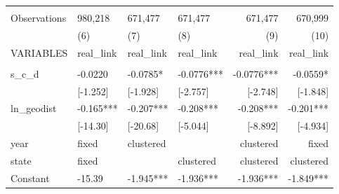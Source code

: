 \documentclass[a4paper]{article}
\begin{document}
\begin{table}[htbp]
\begin{tabular}{p{9.7em}lllrr}
          & \multicolumn{1}{p{5.3em}}{} & \multicolumn{1}{p{5.3em}}{} & \multicolumn{1}{p{5.3em}}{} & \multicolumn{1}{p{5.3em}}{} & \multicolumn{1}{p{5.3em}}{} \\
    Observations & \multicolumn{1}{p{5.3em}}{980,218} & \multicolumn{1}{p{5.3em}}{671,477} & \multicolumn{1}{p{5.3em}}{671,477} & \multicolumn{1}{p{5.3em}}{671,477} & \multicolumn{1}{p{5.3em}}{670,999} \\
    \midrule
          & \multicolumn{1}{p{5.3em}}{(6)} & \multicolumn{1}{p{5.3em}}{(7)} & \multicolumn{1}{p{5.3em}}{(8)} & \multicolumn{1}{p{5.3em}}{(9)} & \multicolumn{1}{p{5.3em}}{(10)} \\
    VARIABLES & \multicolumn{1}{p{5.3em}}{real\_link} & \multicolumn{1}{p{5.3em}}{real\_link} & \multicolumn{1}{p{5.3em}}{real\_link} & \multicolumn{1}{p{5.3em}}{real\_link} & \multicolumn{1}{p{5.3em}}{real\_link} \\
    \midrule
          & \multicolumn{1}{p{5.3em}}{} & \multicolumn{1}{p{5.3em}}{} & \multicolumn{1}{p{5.3em}}{} & \multicolumn{1}{p{5.3em}}{} & \multicolumn{1}{p{5.3em}}{} \\
    s\_c\_d & \multicolumn{1}{p{5.3em}}{-0.0220} & \multicolumn{1}{p{5.3em}}{-0.0785*} & \multicolumn{1}{p{5.3em}}{-0.0776***} & \multicolumn{1}{p{5.3em}}{-0.0776***} & \multicolumn{1}{p{5.3em}}{-0.0559*} \\
          & \multicolumn{1}{p{5.3em}}{[-1.252]} & \multicolumn{1}{p{5.3em}}{[-1.928]} & \multicolumn{1}{p{5.3em}}{[-2.757]} & \multicolumn{1}{p{5.3em}}{[-2.748]} & \multicolumn{1}{p{5.3em}}{[-1.848]} \\
    ln\_geodist & \multicolumn{1}{p{5.3em}}{-0.165***} & \multicolumn{1}{p{5.3em}}{-0.207***} & \multicolumn{1}{p{5.3em}}{-0.208***} & \multicolumn{1}{p{5.3em}}{-0.208***} & \multicolumn{1}{p{5.3em}}{-0.201***} \\
          & \multicolumn{1}{p{5.3em}}{[-14.30]} & \multicolumn{1}{p{5.3em}}{[-20.68]} & \multicolumn{1}{p{5.3em}}{[-5.044]} & \multicolumn{1}{p{5.3em}}{[-8.892]} & \multicolumn{1}{p{5.3em}}{[-4.934]} \\
    year  & \multicolumn{1}{p{5.3em}}{fixed} & \multicolumn{1}{p{5.3em}}{clustered} &       & \multicolumn{1}{p{5.3em}}{clustered} & \multicolumn{1}{p{5.3em}}{fixed} \\
    state & \multicolumn{1}{p{5.3em}}{fixed} &       & \multicolumn{1}{p{5.3em}}{clustered} & \multicolumn{1}{p{5.3em}}{clustered} & \multicolumn{1}{p{5.3em}}{clustered} \\
    Constant & \multicolumn{1}{p{5.3em}}{-15.39} & \multicolumn{1}{p{5.3em}}{-1.945***} & \multicolumn{1}{p{5.3em}}{-1.936***} & \multicolumn{1}{p{5.3em}}{-1.936***} & \multicolumn{1}{p{5.3em}}{-1.849***} \\

\end{tabular}
\end{table}
\end{document}
